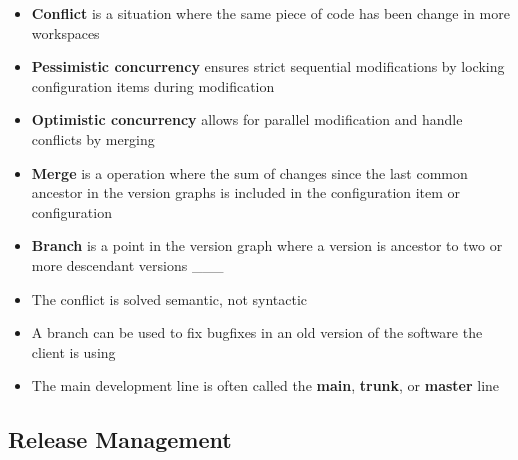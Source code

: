 \documentclass[11pt]{article}
\begin{document}
\begin{itemize}
\item
  \textbf{Conflict} is a situation where the same piece of code has been
  change in more workspaces
\item
  \textbf{Pessimistic concurrency} ensures strict sequential
  modifications by locking configuration items during modification
\item
  \textbf{Optimistic concurrency} allows for parallel modification and
  handle conflicts by merging
\item
  \textbf{Merge} is a operation where the sum of changes since the last
  common ancestor in the version graphs is included in the configuration
  item or configuration
\item
  \textbf{Branch} is a point in the version graph where a version is
  ancestor to two or more descendant versions \_\_\_
\item
  The conflict is solved semantic, not syntactic
\item
  A branch can be used to fix bugfixes in an old version of the software
  the client is using
\item
  The main development line is often called the \textbf{main},
  \textbf{trunk}, or \textbf{master} line
\end{itemize}

\hypertarget{release-management}{%
\subsection{Release Management}\label{release-management}}
\end{document}
